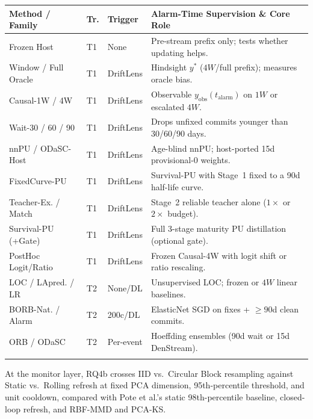 \documentclass[pdflatex,sn-basic]{sn-jnl}
\renewcommand{\arraystretch}{1.06}
\theoremstyle{definition}
\theoremstyle{plain}
\begin{document}
\par\smallskip\noindent
\begin{minipage}{\textwidth}
\fontsize{7.5}{8.7}\selectfont
\setlength{\tabcolsep}{1.4pt}
\renewcommand{\arraystretch}{0.99}
\begin{tabularx}{\textwidth}{L{2.88cm}C{0.42cm}L{1.28cm}Y}
\toprule
\textbf{Method / Family} & \textbf{Tr.} & \textbf{Trigger} & \textbf{Alarm-Time Supervision \& Core Role} \\
\midrule
Frozen Host & T1 & None & Pre-stream prefix only; tests whether updating helps. \\
Window / Full Oracle & T1 & DriftLens & Hindsight $y^*$ ($4W$/full prefix); measures oracle bias. \\
Causal-1W / 4W & T1 & DriftLens & Observable $y_{\text{obs}}(t_{\text{alarm}})$ on $1W$ or escalated $4W$. \\
Wait-30 / 60 / 90 & T1 & DriftLens & Drops unfixed commits younger than 30/60/90 days. \\
nnPU / ODaSC-Host & T1 & DriftLens & Age-blind nnPU; host-ported 15d provisional-0 weights. \\
FixedCurve-PU & T1 & DriftLens & Survival-PU with Stage~1 fixed to a 90d half-life curve. \\
Teacher-Ex. / Match & T1 & DriftLens & Stage~2 reliable teacher alone ($1\times$ or $2\times$ budget). \\
Survival-PU (+Gate) & T1 & DriftLens & Full 3-stage maturity PU distillation (optional gate). \\
PostHoc Logit/Ratio & T1 & DriftLens & Frozen Causal-4W with logit shift or ratio rescaling. \\
LOC / LApred. / LR & T2 & None/DL & Unsupervised LOC; frozen or $4W$ linear baselines. \\
BORB-Nat. / Alarm & T2 & 200c/DL & ElasticNet SGD on fixes + $\ge 90$d clean commits. \\
ORB / ODaSC & T2 & Per-event & Hoeffding ensembles (90d wait or 15d DenStream). \\
\bottomrule
\addlinespace[2pt]
 \\
\end{tabularx}
\end{minipage}
\par\smallskip

At the monitor layer, RQ4b crosses IID vs.\ Circular Block resampling against Static vs.\ Rolling refresh at fixed PCA dimension, 95th-percentile threshold, and unit cooldown, compared with Pote et al.'s static 98th-percentile baseline, closed-loop refresh, and RBF-MMD and PCA-KS.
\end{document}
